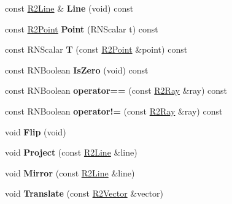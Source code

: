 \begin{DoxyCompactItemize}
\item 
const \hyperlink{class_r2_line}{R2\+Line} \& {\bfseries Line} (void) const \hypertarget{class_r2_ray_a38d77d185f13ecbf390b5eaf32922b4f}{}\label{class_r2_ray_a38d77d185f13ecbf390b5eaf32922b4f}

\item 
const \hyperlink{class_r2_point}{R2\+Point} {\bfseries Point} (R\+N\+Scalar t) const \hypertarget{class_r2_ray_a722370932b3d7a26b6f21f4c13184e10}{}\label{class_r2_ray_a722370932b3d7a26b6f21f4c13184e10}

\item 
const R\+N\+Scalar {\bfseries T} (const \hyperlink{class_r2_point}{R2\+Point} \&point) const \hypertarget{class_r2_ray_a6d0f777be74fa6ef3ed557091a436788}{}\label{class_r2_ray_a6d0f777be74fa6ef3ed557091a436788}

\item 
const R\+N\+Boolean {\bfseries Is\+Zero} (void) const \hypertarget{class_r2_ray_a52c2256f3ef0101ef527cce99da17542}{}\label{class_r2_ray_a52c2256f3ef0101ef527cce99da17542}

\item 
const R\+N\+Boolean {\bfseries operator==} (const \hyperlink{class_r2_ray}{R2\+Ray} \&ray) const \hypertarget{class_r2_ray_aa1c3442812cb79b5e4317926ba7ebe41}{}\label{class_r2_ray_aa1c3442812cb79b5e4317926ba7ebe41}

\item 
const R\+N\+Boolean {\bfseries operator!=} (const \hyperlink{class_r2_ray}{R2\+Ray} \&ray) const \hypertarget{class_r2_ray_ae3aa90451d20275d45e8f7a69cc670bf}{}\label{class_r2_ray_ae3aa90451d20275d45e8f7a69cc670bf}

\item 
void {\bfseries Flip} (void)\hypertarget{class_r2_ray_aa752b2be96cd80d15b01c28df3c8e850}{}\label{class_r2_ray_aa752b2be96cd80d15b01c28df3c8e850}

\item 
void {\bfseries Project} (const \hyperlink{class_r2_line}{R2\+Line} \&line)\hypertarget{class_r2_ray_aea1d71187182f874a534747063d62e5f}{}\label{class_r2_ray_aea1d71187182f874a534747063d62e5f}

\item 
void {\bfseries Mirror} (const \hyperlink{class_r2_line}{R2\+Line} \&line)\hypertarget{class_r2_ray_a2c72c0b6ec38b7b5ea91f48053d02111}{}\label{class_r2_ray_a2c72c0b6ec38b7b5ea91f48053d02111}

\item 
void {\bfseries Translate} (const \hyperlink{class_r2_vector}{R2\+Vector} \&vector)\hypertarget{class_r2_ray_a11627982fdad4034f40ccbc4f8352391}{}\label{class_r2_ray_a11627982fdad4034f40ccbc4f8352391}


\end{DoxyCompactItemize}
